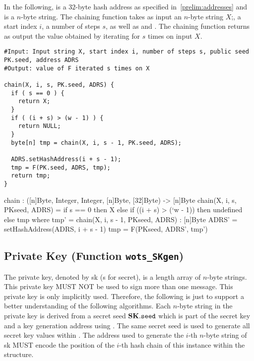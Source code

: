 In the following, \adrs is a $32$-byte \wotsp hash address as specified
in~\autoref{prelim:addresses} and
\pseed is a $n$-byte string. The chaining function takes as input an
$n$-byte string $X$;, a start index $i$, a number of steps $s$, as well as \adrs and
\pseed.  The chaining function returns as output the value obtained by iterating
\sphincsF for $s$ times on input $X$.

\begin{lstlisting}[breaklines=true,label=alg:chaining, language=pseudoc,
                   caption=\texttt{chain} -- Chaining function used in \wotsp.]
#Input: Input string X, start index i, number of steps s, public seed PK.seed, address ADRS
#Output: value of F iterated s times on X

chain(X, i, s, PK.seed, ADRS) {
  if ( s == 0 ) {
    return X;
  }
  if ( (i + s) > (w - 1) ) {
    return NULL;
  }
  byte[n] tmp = chain(X, i, s - 1, PK.seed, ADRS);

  ADRS.setHashAddress(i + s - 1);
  tmp = F(PK.seed, ADRS, tmp);
  return tmp;
}
\end{lstlisting}

\begin{code}
  chain : ([n]Byte, Integer, Integer, [n]Byte, [32]Byte) -> [n]Byte
  chain(X, i, s, PKseed, ADRS) =
    if s == 0 then
      X
    else if ((i + s) > (`w - 1)) then
      undefined
    else
      tmp
      where
        tmp' = chain(X, i, s - 1, PKseed, ADRS) : [n]Byte
        ADRS' = setHashAddress(ADRS, i + s - 1)
        tmp = F(PKseed, ADRS', tmp')
\end{code}

\subsection{\wotsp Private Key (Function \texttt{wots\_SKgen})}
The \wotsp private key, denoted by sk (s for secret), is a length \len array of
$n$-byte strings. This private key MUST NOT be used to sign more than one
message. This private key is only implicitly used. Therefore, the following is
just to support a better understanding of the following algorithms.
Each $n$-byte string in the \wotsp private key is derived from a secret
seed $\mathbf{SK}.\texttt{seed}$ which is part of the \spx secret key and
a \wotsp key generation address \skadrs using \sphincsPRF. The same secret seed is used to generate
all secret key values within \spx.
The address used to generate the $i$-th $n$-byte string of sk
MUST encode the position of the $i$-th hash chain of this \wotsp instance
within the \spx structure.

